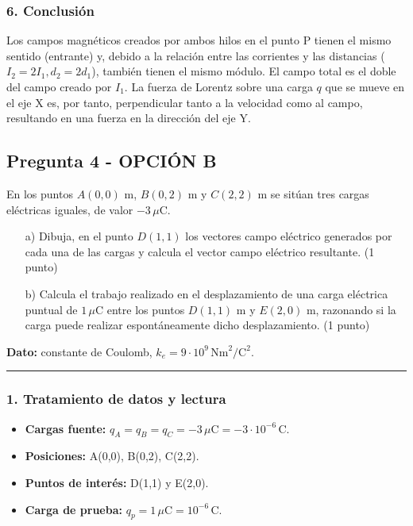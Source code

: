 \subsubsection*{6. Conclusión}
\begin{cajaconclusion}
Los campos magnéticos creados por ambos hilos en el punto P tienen el mismo sentido (entrante) y, debido a la relación entre las corrientes y las distancias ($I_2=2I_1, d_2=2d_1$), también tienen el mismo módulo. El campo total es el doble del campo creado por $I_1$. La fuerza de Lorentz sobre una carga $q$ que se mueve en el eje X es, por tanto, perpendicular tanto a la velocidad como al campo, resultando en una fuerza en la dirección del eje Y.
\end{cajaconclusion}
\newpage

\subsection{Pregunta 4 - OPCIÓN B}
\label{subsec:4B_2018_jul_ext}
\begin{cajaenunciado}
En los puntos $A(0,0)$ m, $B(0, 2)$ m y $C(2,2)$ m se sitúan tres cargas eléctricas iguales, de valor $-3\,\mu\text{C}$.
\begin{enumerate}
    \item[a)] Dibuja, en el punto $D(1,1)$ los vectores campo eléctrico generados por cada una de las cargas y calcula el vector campo eléctrico resultante. (1 punto)
    \item[b)] Calcula el trabajo realizado en el desplazamiento de una carga eléctrica puntual de $1\,\mu\text{C}$ entre los puntos $D(1,1)$ m y $E(2,0)$ m, razonando si la carga puede realizar espontáneamente dicho desplazamiento. (1 punto)
\end{enumerate}
\textbf{Dato:} constante de Coulomb, $k_{e}=9\cdot10^{9}\,\text{Nm}^2/\text{C}^2$.
\end{cajaenunciado}
\hrule
\subsubsection*{1. Tratamiento de datos y lectura}
\begin{itemize}
    \item \textbf{Cargas fuente:} $q_A=q_B=q_C = -3\,\mu\text{C} = -3\cdot10^{-6}\,\text{C}$.
    \item \textbf{Posiciones:} A(0,0), B(0,2), C(2,2).
    \item \textbf{Puntos de interés:} D(1,1) y E(2,0).
    \item \textbf{Carga de prueba:} $q_p=1\,\mu\text{C}=10^{-6}\,\text{C}$.
\end{itemize}

